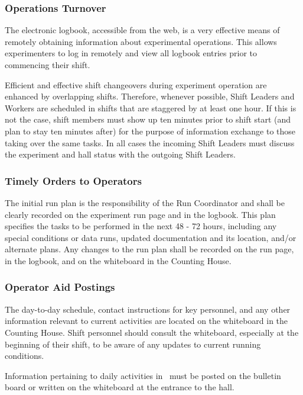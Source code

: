 \documentclass[11pt]{article}
\begin{document}
\subsubsection{Operations Turnover}
\indent

The electronic logbook, accessible from the web, is a very effective means 
of remotely obtaining information about experimental operations. This allows 
experimenters to log in remotely and view all logbook entries prior to commencing
their shift.

Efficient and effective shift changeovers during experiment operation are enhanced
by overlapping shifts. Therefore, whenever possible, Shift Leaders and Workers are
scheduled in shifts that are staggered by at least one hour. If this is not the case,
shift members must show up ten minutes prior to shift start (and plan to stay ten minutes
after) for the purpose of information exchange to those taking over the same tasks. In all
cases the incoming Shift Leaders must discuss the experiment and hall status with the
outgoing Shift Leaders.

\subsubsection{Timely Orders to Operators}
\indent

The initial run plan is the responsibility of the Run Coordinator and shall be clearly
recorded on the experiment run page and in the logbook. This plan specifies the tasks
to be performed in the next 48 - 72 hours, including any special conditions or data runs,
updated documentation and its location, and/or alternate plans. Any changes to the run
plan shall be recorded on the run page, in the logbook, and on the whiteboard in the
Counting House.

\subsubsection{Operator Aid Postings}
\indent

The day-to-day schedule, contact instructions for key personnel, and 
any other information relevant to current activities are located
on the whiteboard in the Counting House. Shift personnel should
consult the whiteboard, especially at the beginning
of their shift, to be aware of any updates to current running conditions.

Information pertaining to daily activities in \HALL\ must be posted on the 
bulletin board or written on the whiteboard at the entrance to the hall.
\end{document}
